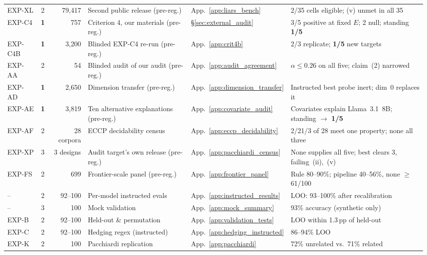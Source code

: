 \begin{table}[t]
\begin{scriptsize}
\begin{tabular}{lcrlll}
EXP-XL & 2 & 79{,}417 & Second public release (pre-reg.) & App.~\ref{app:liars_bench} & 2/35 cells eligible; (v) unmet in all 35 \\
EXP-C4 & \textbf{1} & 757 & Criterion 4, our materials (pre-reg.) & \S\ref{sec:external_audit} & 3/5 positive at fixed $E$; 2 null; standing \textbf{1/5} \\
EXP-C4B & \textbf{1} & 3{,}200 & Blinded EXP-C4 re-run (pre-reg.) & App.~\ref{app:crit4b} & 2/3 replicate; \textbf{1/5} new targets \\
EXP-AA & 2 & 54 & Blinded audit of our audit (pre-reg.) & App.~\ref{app:audit_agreement} & $\alpha\!\leq\!0.26$ on all five; claim~(2) narrowed \\
EXP-AD & \textbf{1} & 2{,}650 & Dimension transfer (pre-reg.) & App.~\ref{app:dimension_transfer} & Instructed best probe inert; dim~0 replaces it \\
EXP-AE & \textbf{1} & 3{,}819 & Ten alternative explanations (pre-reg.) & App.~\ref{app:covariate_audit} & Covariates explain Llama~3.1~8B; standing $\to$ \textbf{1/5} \\
EXP-AF & 2 & 28 corpora & ECCP decidability census & App.~\ref{app:eccp_decidability} & 2/21/3 of 28 meet one property; none all three \\
EXP-XP & 3 & 3 designs & Audit target's own release (pre-reg.) & App.~\ref{app:pacchiardi_census} & None supplies all five; best clears 3, failing~(ii),~(v) \\
EXP-FS & 2 & 699 & Frontier-scale panel (pre-reg.) & App.~\ref{app:frontier_panel} & Rule 80--90\%; pipeline 40--56\%, none $\geq$61/100 \\
\midrule
-- & 2 & 92--100 & Per-model instructed evals & App.~\ref{app:instructed_results} & LOO: 93--100\% after recalibration \\
-- & 3 & 100 & Mock validation & App.~\ref{app:mock_summary} & 93\% accuracy (synthetic only) \\
EXP-B & 2 & 92--100 & Held-out \& permutation & App.~\ref{app:validation_tests} & LOO within 1.3\,pp of held-out \\
EXP-C & 2 & 92--100 & Hedging regex (instructed) & App.~\ref{app:hedging_instructed} & 86--94\% LOO \\
EXP-K & 2 & 100 & Pacchiardi replication & App.~\ref{app:pacchiardi} & 72\% unrelated vs.\ 71\% related \\
\bottomrule
\end{tabular}
\end{scriptsize}
\end{table}

